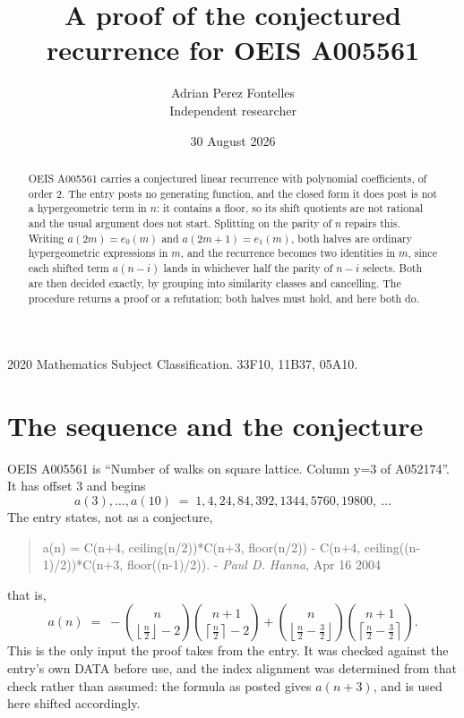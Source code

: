 \documentclass[11pt,a4paper]{article}
\title{A proof of the conjectured recurrence for OEIS A005561}
\author{Adrian Perez Fontelles\\ \small Independent researcher}
\date{30 August 2026}
\theoremstyle{plain}
\theoremstyle{definition}
\begin{document}
\maketitle

\begin{abstract}
OEIS A005561 carries a conjectured linear recurrence with polynomial coefficients, of
order 2. The entry posts no generating function, and the closed form it does post
is not a hypergeometric term in $n$: it contains a floor, so its shift quotients are not
rational and the usual argument does not start. Splitting on the parity of $n$ repairs
this. Writing $a(2m)=e_{0}(m)$ and $a(2m+1)=e_{1}(m)$, both halves are ordinary
hypergeometric expressions in $m$, and the recurrence becomes two identities in $m$, since
each shifted term $a(n-i)$ lands in whichever half the parity of $n-i$ selects. Both are
then decided exactly, by grouping into similarity classes and cancelling. The procedure
returns a proof or a refutation; both halves must hold, and here both do.
\end{abstract}

\noindent\small 2020 Mathematics Subject Classification. 33F10, 11B37, 05A10.\normalsize

\section{The sequence and the conjecture}

OEIS A005561 is ``Number of walks on square lattice. Column y=3 of A052174''. It has offset $3$ and begins
\[
a(3),\dots,a(10)\;=\;1, 4, 24, 84, 392, 1344, 5760, 19800,\ \dots
\]
The entry states, not as a conjecture,
\begin{quote}\small
a(n) = C(n+4, ceiling(n/2))*C(n+3, floor(n/2)) - C(n+4, ceiling((n-1)/2))*C(n+3, floor((n-1)/2)). - \emph{Paul D. Hanna}, Apr 16 2004
\end{quote}
that is,
\begin{equation}\label{eq:cf}
a(n)\;=\;- {\binom{n}{\left\lfloor{\frac{n}{2}}\right\rfloor - 2}} {\binom{n + 1}{\left\lceil{\frac{n}{2}}\right\rceil - 2}} + {\binom{n}{\left\lfloor{\frac{n}{2} - \frac{3}{2}}\right\rfloor}} {\binom{n + 1}{\left\lceil{\frac{n}{2} - \frac{3}{2}}\right\rceil}} .
\end{equation}
This is the only input the proof takes from the entry. It was checked against the entry's
own DATA before use, and the index alignment was determined from that check rather than
assumed: the formula as posted gives $a(n+3)$, and is used here shifted accordingly.
\end{document}
